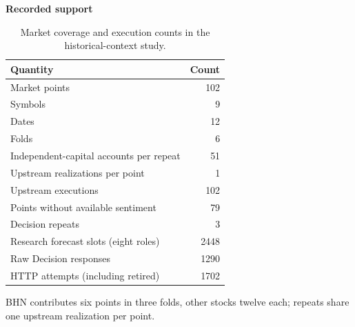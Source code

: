 \begin{table}[!htb]
\centering\small
\setlength{\tabcolsep}{3pt}
\renewcommand{\arraystretch}{1.12}
\caption{Market coverage and execution counts in the historical-context study.}
\label{tab:u09-scope}
\textbf{Recorded support}\par\smallskip
\begin{tabular}{lr}
\hline
Quantity & Count \\
\hline
Market points & 102 \\
Symbols & 9 \\
Dates & 12 \\
Folds & 6 \\
Independent-capital accounts per repeat & 51 \\
Upstream realizations per point & 1 \\
Upstream executions & 102 \\
Points without available sentiment & 79 \\
Decision repeats & 3 \\
Research forecast slots (eight roles) & 2448 \\
Raw Decision responses & 1290 \\
HTTP attempts (including retired) & 1702 \\
\hline
\end{tabular}\par\medskip
\begin{minipage}{\textwidth}\footnotesize BHN contributes six points in three folds, other stocks twelve each; repeats share one upstream realization per point.\end{minipage}
\end{table}
